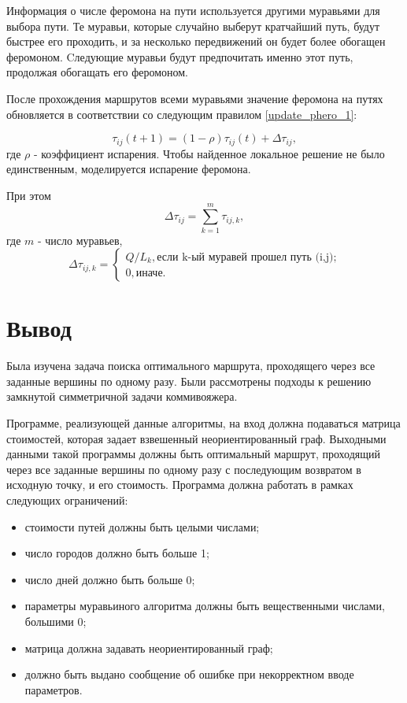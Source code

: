 Информация о числе феромона на пути используется другими муравьями для выбора пути. Те муравьи, которые случайно выберут кратчайший путь, будут быстрее его проходить, и за несколько передвижений он будет более обогащен феромоном. Cледующие муравьи будут предпочитать именно этот путь, продолжая обогащать его феромоном. 

После прохождения маршрутов всеми муравьями значение феромона на путях обновляется в соответствии со следующим правилом \eqref{update_phero_1}:

\begin{equation}
	\label{update_phero_1}
		\tau_{ij}(t+1) = (1-\rho)\tau_{ij}(t) + \Delta \tau_{ij},
\end{equation}
где $\rho$ - коэффициент испарения. Чтобы найденное локальное решение не было единственным, моделируется испарение феромона.

При этом
\begin{equation}
\label{update_phero_2}
 \Delta \tau_{ij} = \sum_{k=1}^m \tau_{ij, k},
\end{equation}
где $m$ - число муравьев,
\begin{equation}
	\label{update_phero_3}
		 \Delta\tau_{ij,k} = \begin{cases}
		Q/L_{k}, \textrm{если k-ый муравей прошел путь (i,j);} \\
		0, \textrm{иначе.}
	\end{cases}
\end{equation}

\section{Вывод}

Была изучена задача поиска оптимального маршрута, проходящего через все заданные вершины по одному разу. Были рассмотрены подходы к решению замкнутой симметричной задачи коммивояжера.

Программе, реализующей данные алгоритмы, на вход должна подаваться матрица стоимостей, которая задает взвешенный неориентированный граф. Выходными данными такой программы должны быть оптимальный маршрут, проходящий через все заданные вершины по одному разу с последующим возвратом в исходную точку, и его стоимость. Программа должна работать в рамках следующих ограничений: 

\begin{itemize}
	\item стоимости путей должны быть целыми числами;
	\item число городов должно быть больше 1;
	\item число дней должно быть больше 0;
	\item параметры муравьиного алгоритма должны быть вещественными числами, большими 0;
	\item матрица должна задавать неориентированный граф;
	\item должно быть выдано сообщение об ошибке при некорректном вводе параметров.
\end{itemize}

